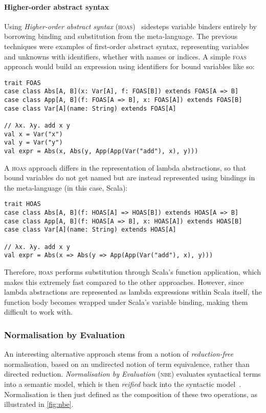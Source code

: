 \documentclass[../../main.tex]{subfiles}
\begin{document}
\paragraph{Higher-order abstract syntax}
Using \emph{Higher-order abstract syntax} (\textsc{hoas})~\cite{pfenning_hoas_1988} sidesteps variable binders entirely by borrowing binding and substitution from the meta-language.
The previous techniques were examples of first-order abstract syntax, representing variables and unknowns with identifiers, whether with names or indices.
A simple \textsc{foas} approach would build an expression using identifiers for bound variables like so:
\begin{verbatim}
trait FOAS
case class Abs[A, B](x: Var[A], f: FOAS[B]) extends FOAS[A => B]
case class App[A, B](f: FOAS[A => B], x: FOAS[A]) extends FOAS[B]
case class Var[A](name: String) extends FOAS[A]

// λx. λy. add x y
val x = Var("x")
val y = Var("y")
val expr = Abs(x, Abs(y, App(App(Var("add"), x), y)))
\end{verbatim}
%
A \textsc{hoas} approach differs in the representation of lambda abstractions, so that bound variables do not get named but are instead represented using bindings in the meta-language (in this case, Scala):
\begin{verbatim}
trait HOAS
case class Abs[A, B](f: HOAS[A] => HOAS[B]) extends HOAS[A => B]
case class App[A, B](f: HOAS[A => B], x: HOAS[A]) extends HOAS[B]
case class Var[A](name: String) extends HOAS[A]

// λx. λy. add x y
val expr = Abs(x => Abs(y => App(App(Var("add"), x), y)))
\end{verbatim}
%
Therefore, \textsc{hoas} performs substitution through Scala's function application, which makes this extremely fast compared to the other approaches.
However, since lambda abstractions are represented as lambda expressions within Scala itself, the function body becomes wrapped under Scala's variable binding, making them difficult to work with.


\subsubsection{Normalisation by Evaluation}
An interesting alternative approach stems from a notion of \emph{reduction-free} normalisation, based on an undirected notion of term equivalence, rather than directed reduction.
\emph{Normalisation by Evaluation} (\textsc{nbe}) evaluates syntactical terms into a semantic model, which is then \emph{reified} back into the syntactic model~\cite{filinski_nbe_2004}.
Normalisation is then just defined as the composition of these two operations, as illustrated in \cref{fig:nbe}.
\end{document}
